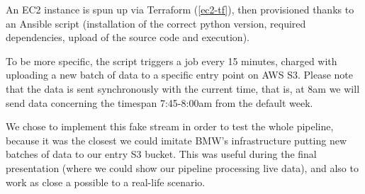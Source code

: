     An EC2 instance is spun up via Terraform (\ref{ec2-tf}), then provisioned thanks to an Ansible script (installation of the correct python version, required dependencies,  upload of the source code and execution). \par
    
    To be more specific, the script triggers a job every 15 minutes, charged with uploading a new batch of data to a specific entry point on AWS S3.
    Please note that the data is sent synchronously with the current time, that is, at 8am we will send data concerning the timespan 7:45-8:00am from the default week. \par
    
    We chose to implement this fake stream in order to test the whole pipeline, because it was the closest we could imitate BMW's infrastructure putting new batches of data to our entry S3 bucket. This was useful during the final presentation (where we could show our pipeline processing live data), and also to work as close a possible to a real-life scenario.

